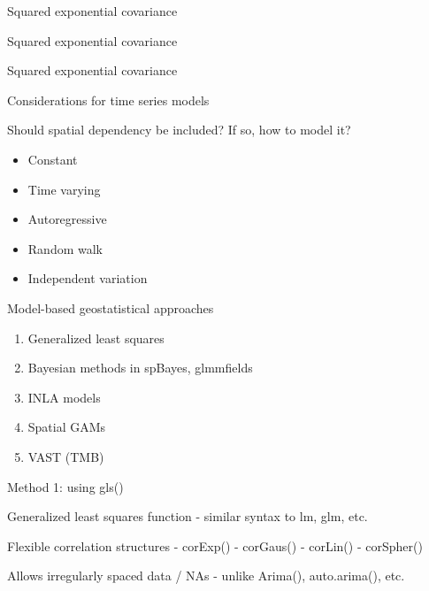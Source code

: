 \documentclass[ignorenonframetext,]{beamer}
\providecommand{\tightlist}{%
  \setlength{\itemsep}{0pt}\setlength{\parskip}{0pt}}
\begin{document}
\begin{frame}{Squared exponential covariance}
\protect\hypertarget{squared-exponential-covariance}{}

\end{frame}

\begin{frame}{Squared exponential covariance}
\protect\hypertarget{squared-exponential-covariance-1}{}

\end{frame}

\begin{frame}{Squared exponential covariance}
\protect\hypertarget{squared-exponential-covariance-2}{}

\end{frame}

\begin{frame}{Considerations for time series models}
\protect\hypertarget{considerations-for-time-series-models}{}

Should spatial dependency be included? If so, how to model it?

\begin{itemize}
\tightlist
\item
  Constant
\item
  Time varying
\item
  Autoregressive
\item
  Random walk
\item
  Independent variation
\end{itemize}

\end{frame}

\begin{frame}{Model-based geostatistical approaches}
\protect\hypertarget{model-based-geostatistical-approaches}{}

\begin{enumerate}
\item
  Generalized least squares
\item
  Bayesian methods in spBayes, glmmfields
\item
  INLA models
\item
  Spatial GAMs
\item
  VAST (TMB)
\end{enumerate}

\end{frame}

\begin{frame}{Method 1: using gls()}
\protect\hypertarget{method-1-using-gls}{}

Generalized least squares function - similar syntax to lm, glm, etc.

Flexible correlation structures - corExp() - corGaus() - corLin() -
corSpher()

Allows irregularly spaced data / NAs - unlike Arima(), auto.arima(),
etc.

\end{frame}
\end{document}
